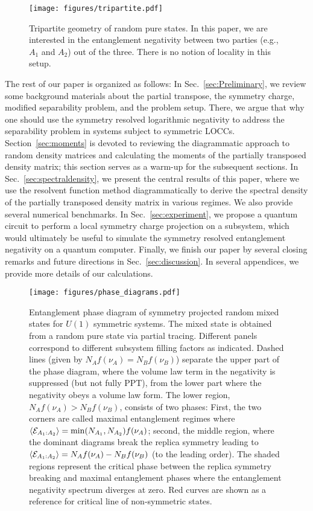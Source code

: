 \documentclass[aps,pra,reprint,superscriptaddress,twocolumn,notitlepage]{revtex4-1}
\numberwithin{equation}{section}
\begin{document}
\begin{figure}
\centering
\texttt{[image: figures/tripartite.pdf]}
\caption{\label{fig:geometry} Tripartite geometry of random pure states.
In this paper, we are interested in the entanglement negativity between two parties (e.g., $A_1$ and $A_2$) out of the three. There is no notion of locality in this setup.}
\end{figure}




\bigskip


The rest of our paper is organized as follows:
In Sec.~\ref{sec:Preliminary},
we review some background materials about the partial transpose, the symmetry charge, modified separability problem, and the problem setup. There, we argue that why one should use the symmetry resolved logarithmic negativity to address the separability problem in systems subject to symmetric LOCCs.
Section~\ref{sec:moments} is devoted to reviewing the diagrammatic approach to random density matrices and calculating the moments of the partially transposed density matrix; this section serves as a warm-up for the subsequent sections.
In Sec.~\ref{sec:spectraldensity}, we present the central results of this paper, where we use the resolvent function method diagrammatically to derive the spectral density of  the partially transposed density matrix in various regimes.
We also provide several numerical benchmarks.
In Sec.~\ref{sec:experiment}, we propose a quantum circuit to perform a local symmetry charge projection on a subsystem, which would ultimately be useful to simulate the symmetry resolved entanglement negativity on a quantum computer. 
Finally, we finish our paper by several closing remarks and future directions in Sec.~\ref{sec:discussion}. In several appendices, we provide more details of our calculations.




\begin{figure*}
    \centering
    \texttt{[image: figures/phase\_diagrams.pdf]}
    \caption{Entanglement phase diagram of symmetry projected random mixed states for $U(1)$ symmetric systems. The mixed state is obtained from a random pure state via partial tracing. Different panels correspond to different subsystem filling factors as indicated. Dashed lines (given by $N_A f(\nu_A)=N_B f(\nu_B)$) separate the upper part of the phase diagram, where the volume law term in the negativity is suppressed (but not fully PPT), from the lower part where the negativity obeys a volume law form. The lower region, $N_A f(\nu_A)>N_B f(\nu_B)$, consists of two phases: First, the two corners are called maximal entanglement regimes where $\braket{{\cal E}_{A_1:A_2}}= \min(N_{A_1},N_{A_2})f(\nu_A)$; second, the middle region, where the dominant diagrams break the replica symmetry leading to $\braket{{\cal E}_{A_1:A_2}}= N_A f(\nu_A)-N_B f(\nu_B)$ (to the leading order). The shaded regions represent the critical phase between the replica symmetry breaking and maximal entanglement phases where the entanglement negativity spectrum diverges at zero. Red curves are shown as a reference for critical line of non-symmetric states.}
    \label{fig:phasediag}
\end{figure*}
\end{document}
